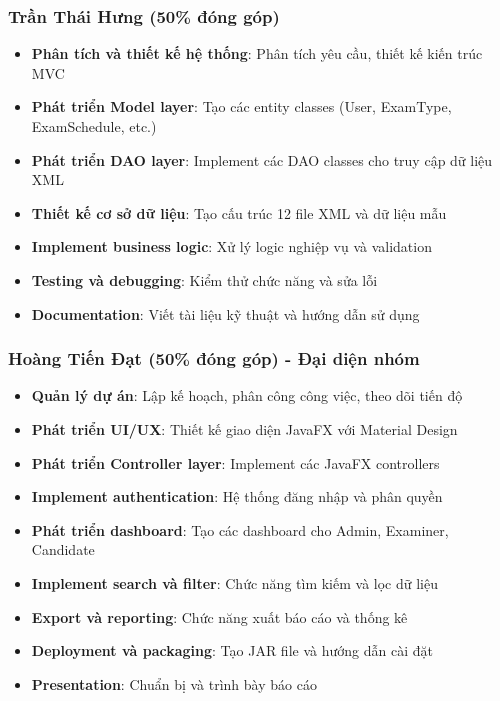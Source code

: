 \documentclass[12pt,a4paper]{article}
\begin{document}
 \subsubsection{Trần Thái Hưng (50\% đóng góp)}
 \begin{itemize}
     \item \textbf{Phân tích và thiết kế hệ thống}: Phân tích yêu cầu, thiết kế kiến trúc MVC
     \item \textbf{Phát triển Model layer}: Tạo các entity classes (User, ExamType, ExamSchedule, etc.)
     \item \textbf{Phát triển DAO layer}: Implement các DAO classes cho truy cập dữ liệu XML
     \item \textbf{Thiết kế cơ sở dữ liệu}: Tạo cấu trúc 12 file XML và dữ liệu mẫu
     \item \textbf{Implement business logic}: Xử lý logic nghiệp vụ và validation
     \item \textbf{Testing và debugging}: Kiểm thử chức năng và sửa lỗi
     \item \textbf{Documentation}: Viết tài liệu kỹ thuật và hướng dẫn sử dụng
 \end{itemize}

 \subsubsection{Hoàng Tiến Đạt (50\% đóng góp) - Đại diện nhóm}
 \begin{itemize}
     \item \textbf{Quản lý dự án}: Lập kế hoạch, phân công công việc, theo dõi tiến độ
     \item \textbf{Phát triển UI/UX}: Thiết kế giao diện JavaFX với Material Design
     \item \textbf{Phát triển Controller layer}: Implement các JavaFX controllers
     \item \textbf{Implement authentication}: Hệ thống đăng nhập và phân quyền
     \item \textbf{Phát triển dashboard}: Tạo các dashboard cho Admin, Examiner, Candidate
     \item \textbf{Implement search và filter}: Chức năng tìm kiếm và lọc dữ liệu
     \item \textbf{Export và reporting}: Chức năng xuất báo cáo và thống kê
     \item \textbf{Deployment và packaging}: Tạo JAR file và hướng dẫn cài đặt
     \item \textbf{Presentation}: Chuẩn bị và trình bày báo cáo
 \end{itemize}
\end{document}
